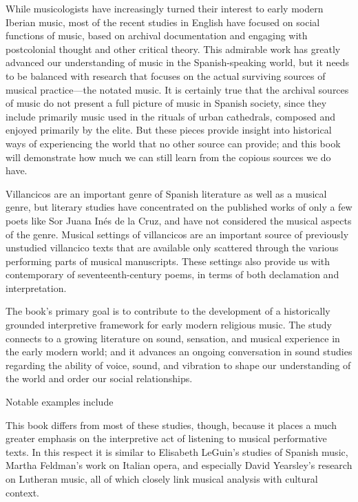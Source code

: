 \documentclass{vcbook-proposal}
\begin{document}
While musicologists have increasingly turned their interest to early modern 
Iberian music, most of the recent studies in English have focused on social 
functions of music, based on archival documentation and engaging with 
postcolonial thought and other critical theory.
This admirable work has greatly advanced our understanding of music in the
Spanish-speaking world, but it needs to be balanced with research that focuses
on the actual surviving sources of musical practice---the notated music.%
  \Autocites{Torrente:PhD}{Baker:Harmony}{Irving:Colonial}
  {BakerKnighton:MusicUrbanSociety}
It is certainly true that the archival sources of music do not present a full 
picture of music in Spanish society, since they include primarily music used 
in the rituals of urban cathedrals, composed and enjoyed primarily by the elite.
But these pieces provide insight into historical ways of experiencing the world 
that no other source can provide; and this book will demonstrate how much we 
can still learn from the copious sources we do have.

Villancicos are an important genre of Spanish literature as well as a musical 
genre, but literary studies have concentrated on the published works 
of only a few poets like Sor Juana Inés de la Cruz, and have not 
considered the musical aspects of the genre.%
  \Autocite{Tenorio:SorJuana}
Musical settings of villancicos are an important source of previously unstudied 
villancico texts that are available only scattered through the various 
performing parts of musical manuscripts.
These settings also provide us with contemporary  of 
seventeenth-century poems, in terms of both declamation and interpretation.

The book's primary goal is to contribute to the development of a historically 
grounded interpretive framework for early modern religious music.
The study connects to a growing literature on sound, sensation, and musical
experience in the early modern world; and it advances an ongoing conversation in
sound studies regarding the ability of voice, sound, and vibration to shape our
understanding of the world and order our social relationships.%
  \begin{Footnote}
      Notable examples include \autocites{Rath:EarlyAmerica}{Feldman:Passions}
      {Austern:Nature}{Gouk:MusicScienceMagic}{Ochoa:Aurality}{Eidsheim:SensingSound}
  \end{Footnote}
This book differs from most of these studies, though, because it places a much
greater emphasis on the interpretive act of listening to musical performative
texts.
In this respect it is similar to Elisabeth LeGuin's studies of Spanish music,
Martha Feldman's work on Italian opera, and especially David Yearsley's research
on Lutheran music, all of which closely link musical analysis with cultural
context.%
    \Autocites{LeGuin:Tonadilla}{LeGuin:BoccheriniBody}
    {Feldman:Opera}{Yearsley:BachCounterpoint}
\end{document}
